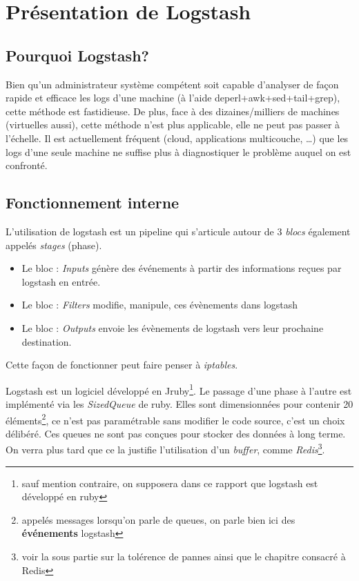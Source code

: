 \section{Présentation de Logstash}

\subsection{Pourquoi Logstash?}
Bien qu'un administrateur système compétent soit capable d'analyser de façon rapide 
et efficace les logs d'une machine (à l'aide deperl+awk+sed+tail+grep), cette méthode
est fastidieuse. De plus, face à des dizaines/milliers de machines (virtuelles aussi), 
cette méthode n'est plus applicable, elle ne peut pas passer à l'échelle.
Il est actuellement fréquent (cloud, applications multicouche, \ldots) que les logs 
d'une seule machine ne suffise plus à diagnostiquer le problème auquel on est confronté.

\subsection{Fonctionnement interne}
L'utilisation de logstash est un pipeline qui s'articule autour de 3 \emph{blocs} 
également appelés \emph{stages} (phase).
\begin{itemize}
    \item   Le bloc : \emph{Inputs} génère des événements à partir des informations reçues
    par logstash en entrée.
    \item   Le bloc : \emph{Filters} modifie, manipule, ces évènements dans logstash
    \item   Le bloc : \emph{Outputs} envoie les évènements de logstash vers leur 
    prochaine destination.
\end{itemize}

Cette façon de fonctionner peut faire penser à \emph{iptables}.

Logstash est un logiciel développé en Jruby\footnote{sauf mention contraire, on supposera
dans ce rapport que logstash est développé en ruby}. Le passage d'une phase 
à l'autre est implémenté via les \emph{SizedQueue} de ruby. Elles sont dimensionnées 
pour contenir 20 éléments\footnote{appelés messages lorsqu'on parle de queues, 
on parle bien ici des \textbf{événements} logstash}, ce n'est pas paramétrable sans 
modifier le code source, c'est un choix délibéré. Ces queues ne sont pas conçues 
pour stocker des données à long terme. On verra plus tard que ce la justifie l'utilisation
d'un \textit{buffer}, comme \emph{Redis}\footnote{voir la sous partie sur la tolérence
de pannes ainsi que le chapitre consacré à Redis}.


